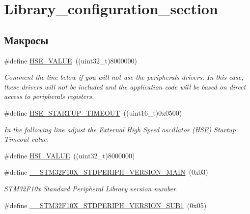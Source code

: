 \hypertarget{group___library__configuration__section}{}\section{Library\+\_\+configuration\+\_\+section}
\label{group___library__configuration__section}
\subsection*{Макросы}
\begin{DoxyCompactItemize}
\item 
\#define \mbox{\hyperlink{group___library__configuration__section_gaeafcff4f57440c60e64812dddd13e7cb}{H\+S\+E\+\_\+\+V\+A\+L\+UE}}~((uint32\+\_\+t)8000000)
\begin{DoxyCompactList}\small\item\em Comment the line below if you will not use the peripherals drivers. In this case, these drivers will not be included and the application code will be based on direct access to peripherals registers. \end{DoxyCompactList}\item 
\#define \mbox{\hyperlink{group___library__configuration__section_ga68ecbc9b0a1a40a1ec9d18d5e9747c4f}{H\+S\+E\+\_\+\+S\+T\+A\+R\+T\+U\+P\+\_\+\+T\+I\+M\+E\+O\+UT}}~((uint16\+\_\+t)0x0500)
\begin{DoxyCompactList}\small\item\em In the following line adjust the External High Speed oscillator (H\+SE) Startup Timeout value. \end{DoxyCompactList}\item 
\#define \mbox{\hyperlink{group___library__configuration__section_gaaa8c76e274d0f6dd2cefb5d0b17fbc37}{H\+S\+I\+\_\+\+V\+A\+L\+UE}}~((uint32\+\_\+t)8000000)
\item 
\#define \mbox{\hyperlink{group___library__configuration__section_ga4c236abf68876febcb304f05ed3bafac}{\+\_\+\+\_\+\+S\+T\+M32\+F10\+X\+\_\+\+S\+T\+D\+P\+E\+R\+I\+P\+H\+\_\+\+V\+E\+R\+S\+I\+O\+N\+\_\+\+M\+A\+IN}}~(0x03)
\begin{DoxyCompactList}\small\item\em S\+T\+M32\+F10x Standard Peripheral Library version number. \end{DoxyCompactList}\item 
\#define \mbox{\hyperlink{group___library__configuration__section_ga7ce69a7c755b9d0551e9755d28612cb0}{\+\_\+\+\_\+\+S\+T\+M32\+F10\+X\+\_\+\+S\+T\+D\+P\+E\+R\+I\+P\+H\+\_\+\+V\+E\+R\+S\+I\+O\+N\+\_\+\+S\+U\+B1}}~(0x05)

\end{DoxyCompactItemize}
